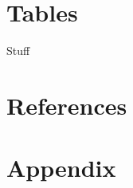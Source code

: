 \documentclass[12pt]{article}
\begin{document}
\newpage
 
\section{Tables}
 


 



 

\begin{table}[!h]
\caption{Stuff}
\label{tab:newtable}
 \scalebox{0.55}{   }
\end{table} 
 
  



 
\clearpage


\section*{References}
\renewcommand*{\refname}{\vspace*{-12mm}} 




\section*{Appendix}
\clearpage
 

 
\end{document}
